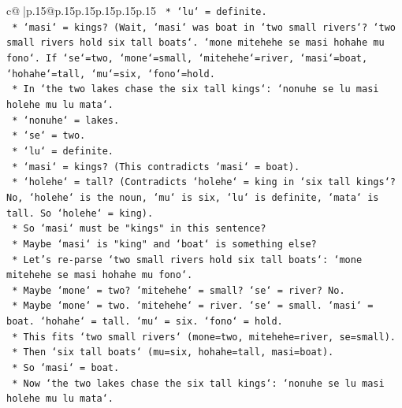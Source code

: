 \documentclass{article}
\begin{document}
{\begin{supertabular}{c@{$\;$}|p{.15\linewidth}@{}p{.15\linewidth}p{.15\linewidth}p{.15\linewidth}p{.15\linewidth}p{.15\linewidth}}
{{{\texttt{                            *   `lu` = definite.} \\
\texttt{                            *   `masi` = kings? (Wait, `masi` was boat in `two small rivers`? `two small rivers hold six tall boats`. `mone mitehehe se masi hohahe mu fono`. If `se`=two, `mone`=small, `mitehehe`=river, `masi`=boat, `hohahe`=tall, `mu`=six, `fono`=hold.} \\
\texttt{                            *   In `the two lakes chase the six tall kings`: `nonuhe se lu masi holehe mu lu mata`.} \\
\texttt{                                *   `nonuhe` = lakes.} \\
\texttt{                                *   `se` = two.} \\
\texttt{                                *   `lu` = definite.} \\
\texttt{                                *   `masi` = kings? (This contradicts `masi` = boat).} \\
\texttt{                                *   `holehe` = tall? (Contradicts `holehe` = king in `six tall kings`? No, `holehe` is the noun, `mu` is six, `lu` is definite, `mata` is tall. So `holehe` = king).} \\
\texttt{                                *   So `masi` must be "kings" in this sentence?} \\
\texttt{                                *   Maybe `masi` is "king" and `boat` is something else?} \\
\texttt{                                *   Let's re{-}parse `two small rivers hold six tall boats`: `mone mitehehe se masi hohahe mu fono`.} \\
\texttt{                                    *   Maybe `mone` = two? `mitehehe` = small? `se` = river? No.} \\
\texttt{                                    *   Maybe `mone` = two. `mitehehe` = river. `se` = small. `masi` = boat. `hohahe` = tall. `mu` = six. `fono` = hold.} \\
\texttt{                                    *   This fits `two small rivers` (mone=two, mitehehe=river, se=small).} \\
\texttt{                                    *   Then `six tall boats` (mu=six, hohahe=tall, masi=boat).} \\
\texttt{                                    *   So `masi` = boat.} \\
\texttt{                                *   Now `the two lakes chase the six tall kings`: `nonuhe se lu masi holehe mu lu mata`.} \\
}}}
\end{supertabular}}
\end{document}
